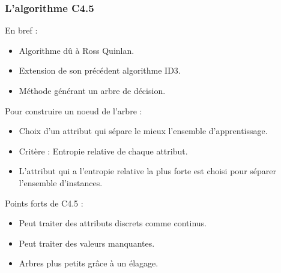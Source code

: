  \begin{frame}
  \frametitle{L'algorithme C4.5}
En bref : 
\begin{itemize}
 \item Algorithme dû à Ross Quinlan.
 \item Extension de son précédent algorithme ID3.
 \item Méthode générant un arbre de décision.
\end{itemize}
Pour construire un noeud de l'arbre : 
\begin{itemize}
 \item Choix d'un attribut qui sépare le mieux l'ensemble d'apprentissage.
 \item Critère : Entropie relative de chaque attribut.
 \item L'attribut qui a l'entropie relative la plus forte est choisi pour séparer l'ensemble d'instances.
\end{itemize}
Points forts de C4.5 :
\begin{itemize}
 \item Peut traiter des attributs discrets comme continus.
 \item Peut traiter des valeurs manquantes.
 \item Arbres plus petits grâce à un élagage.
\end{itemize}


 \end{frame}

